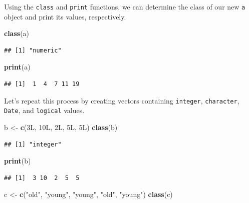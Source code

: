 \documentclass[]{book}
\newenvironment{Shaded}{\begin{snugshade}}{\end{snugshade}}
\newcommand{\KeywordTok}[1]{\textcolor[rgb]{0.13,0.29,0.53}{\textbf{#1}}}
\newcommand{\StringTok}[1]{\textcolor[rgb]{0.31,0.60,0.02}{#1}}
\newcommand{\NormalTok}[1]{#1}
\begin{document}
Using the \texttt{class} and \texttt{print} functions, we can determine
the class of our new \texttt{a} object and print its values,
respectively.

\begin{Shaded}
\begin{Highlighting}[]
\KeywordTok{class}\NormalTok{(a)}
\end{Highlighting}
\end{Shaded}

\begin{verbatim}
## [1] "numeric"
\end{verbatim}

\begin{Shaded}
\begin{Highlighting}[]
\KeywordTok{print}\NormalTok{(a)}
\end{Highlighting}
\end{Shaded}

\begin{verbatim}
## [1]  1  4  7 11 19
\end{verbatim}

Let's repeat this process by creating vectors containing
\texttt{integer}, \texttt{character}, \texttt{Date}, and
\texttt{logical} values.

\begin{Shaded}
\begin{Highlighting}[]
\NormalTok{b <-}\StringTok{ }\KeywordTok{c}\NormalTok{(3L, 10L, 2L, 5L, 5L)}
\KeywordTok{class}\NormalTok{(b)}
\end{Highlighting}
\end{Shaded}

\begin{verbatim}
## [1] "integer"
\end{verbatim}

\begin{Shaded}
\begin{Highlighting}[]
\KeywordTok{print}\NormalTok{(b)}
\end{Highlighting}
\end{Shaded}

\begin{verbatim}
## [1]  3 10  2  5  5
\end{verbatim}

\begin{Shaded}
\begin{Highlighting}[]
\NormalTok{c <-}\StringTok{ }\KeywordTok{c}\NormalTok{(}\StringTok{"old"}\NormalTok{, }\StringTok{"young"}\NormalTok{, }\StringTok{"young"}\NormalTok{, }\StringTok{"old"}\NormalTok{, }\StringTok{"young"}\NormalTok{)}
\KeywordTok{class}\NormalTok{(c)}
\end{Highlighting}
\end{Shaded}
\end{document}
